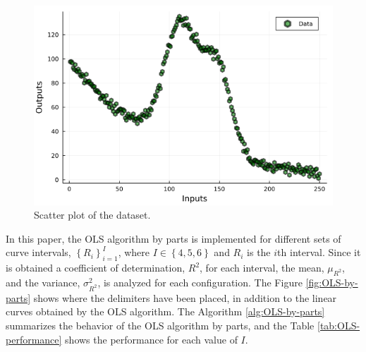 \documentclass[english]{sobraep}
\begin{document}
\begin{figure}[H]
	\includegraphics[scale=.37]{../figs/OLS-by-parts/scatterplot.png}
	\centering
	\caption{Scatter plot of the dataset.}
	\label{fig:scatterplot}
\end{figure}

In this paper, the OLS algorithm by parts is implemented for different sets of curve intervals, \(\left\{ R_i \right\}_{i=1}^{I}\), where \(I \in \left\{ 4,5,6 \right\}\) and \(R_i\) is the \(i\)th interval. Since it is obtained a coefficient of determination, \(R^2\), for each interval, the mean, \(\mu_{R^2}\), and the variance, \(\sigma_{R^2}^2\), is analyzed for each configuration. The Figure \ref{fig:OLS-by-parts} shows where the delimiters have been placed, in addition to the linear curves obtained by the OLS algorithm. The Algorithm \ref{alg:OLS-by-parts} summarizes the behavior of the OLS algorithm by parts, and the Table \ref{tab:OLS-performance} shows the performance for each value of \(I\).
\end{document}

